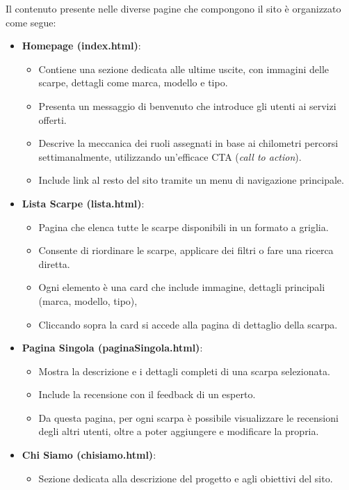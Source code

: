 \documentclass[a4paper, 12pt]{article}
\begin{document}
\begin{justify}
Il contenuto presente nelle diverse pagine che compongono il sito è organizzato come segue:
\begin{itemize}
    \item \textbf{Homepage (index.html)}:
        \begin{itemize}
            \item Contiene una sezione dedicata alle ultime uscite, con immagini delle scarpe, dettagli come marca, modello e tipo.
            \item Presenta un messaggio di benvenuto che introduce gli utenti ai servizi offerti.
            \item Descrive la meccanica dei ruoli assegnati in base ai chilometri percorsi settimanalmente, utilizzando un'efficace CTA (\textit{call to action}).
            \item Include link al resto del sito tramite un menu di navigazione principale.
        \end{itemize}
    \item \textbf{Lista Scarpe (lista.html)}:
        \begin{itemize}
            \item Pagina che elenca tutte le scarpe disponibili in un formato a griglia.
            \item Consente di riordinare le scarpe, applicare dei filtri o fare una ricerca diretta.
            \item Ogni elemento è una card che include immagine, dettagli principali (marca, modello, tipo), 
            \item Cliccando sopra la card si accede alla pagina di dettaglio della scarpa.
        \end{itemize}
    \item \textbf{Pagina Singola (paginaSingola.html)}:
        \begin{itemize}
            \item Mostra la descrizione e i dettagli completi di una scarpa selezionata.
            \item Include la recensione con il feedback di un esperto.
            \item Da questa pagina, per ogni scarpa è possibile visualizzare le recensioni degli altri utenti, oltre a poter aggiungere e modificare la propria.
        \end{itemize}
    \item \textbf{Chi Siamo (chisiamo.html)}:
        \begin{itemize}
            \item Sezione dedicata alla descrizione del progetto e agli obiettivi del sito.

\end{itemize}
\end{itemize}
\end{justify}
\end{document}
